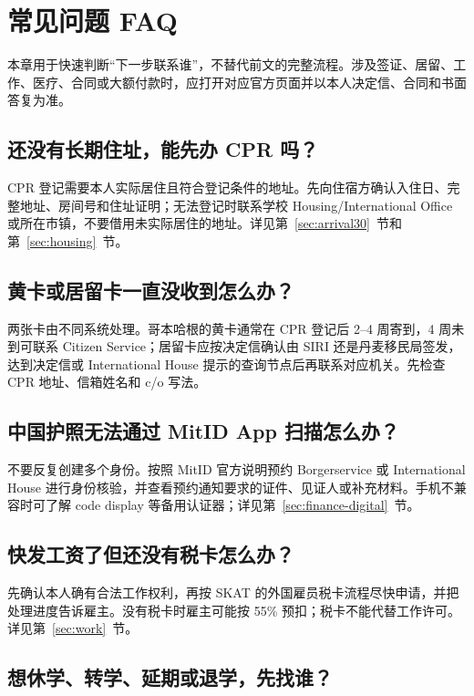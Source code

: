 \section{常见问题 FAQ}\label{sec:faq}

本章用于快速判断“下一步联系谁”，不替代前文的完整流程。涉及签证、居留、工作、医疗、合同或大额付款时，应打开对应官方页面并以本人决定信、合同和书面答复为准。

\subsection*{还没有长期住址，能先办 CPR 吗？}

CPR 登记需要本人实际居住且符合登记条件的地址。先向住宿方确认入住日、完整地址、房间号和住址证明；无法登记时联系学校 Housing/International Office 或所在市镇，不要借用未实际居住的地址。详见第~\ref{sec:arrival30}~节和第~\ref{sec:housing}~节。

\subsection*{黄卡或居留卡一直没收到怎么办？}

两张卡由不同系统处理。哥本哈根的黄卡通常在 CPR 登记后 2--4 周寄到，4 周未到可联系 Citizen Service；居留卡应按决定信确认由 SIRI 还是丹麦移民局签发，达到决定信或 International House 提示的查询节点后再联系对应机关。先检查 CPR 地址、信箱姓名和 c/o 写法。

\subsection*{中国护照无法通过 MitID App 扫描怎么办？}

不要反复创建多个身份。按照 MitID 官方说明预约 Borgerservice 或 International House 进行身份核验，并查看预约通知要求的证件、见证人或补充材料。手机不兼容时可了解 code display 等备用认证器；详见第~\ref{sec:finance-digital}~节。

\subsection*{快发工资了但还没有税卡怎么办？}

先确认本人确有合法工作权利，再按 SKAT 的外国雇员税卡流程尽快申请，并把处理进度告诉雇主。没有税卡时雇主可能按 55\% 预扣；税卡不能代替工作许可。详见第~\ref{sec:work}~节。

\subsection*{想休学、转学、延期或退学，先找谁？}

